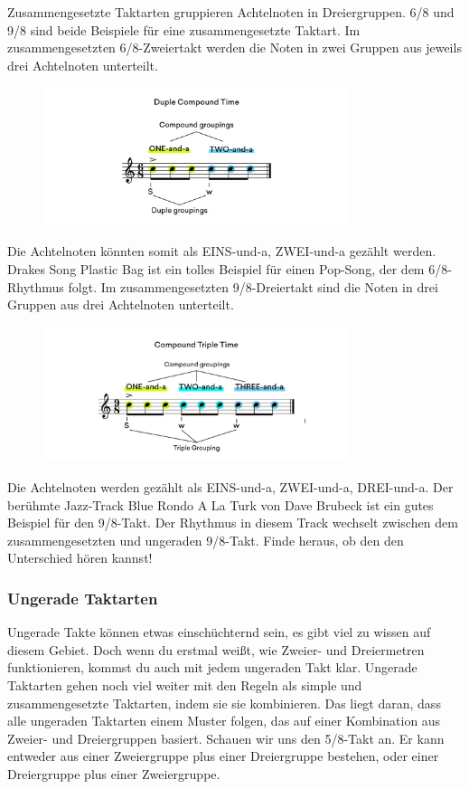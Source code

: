 Zusammengesetzte Taktarten gruppieren Achtelnoten in Dreiergruppen. 6/8 und 9/8 sind beide Beispiele für eine zusammengesetzte Taktart. Im zusammengesetzten 6/8-Zweiertakt werden die Noten in zwei Gruppen aus jeweils drei Achtelnoten unterteilt.

\begin{figure}[H]
    \centering
    \includegraphics[width=0.8\textwidth]{images/Rythm_body_8}
\end{figure}

Die Achtelnoten könnten somit als EINS-und-a, ZWEI-und-a gezählt werden. Drakes Song Plastic Bag ist ein tolles Beispiel für einen Pop-Song, der dem 6/8-Rhythmus folgt. Im zusammengesetzten 9/8-Dreiertakt sind die Noten in drei Gruppen aus drei Achtelnoten unterteilt.

\begin{figure}[H]
    \centering
    \includegraphics[width=0.8\textwidth]{images/Rythm_body_9}
\end{figure}

Die Achtelnoten werden gezählt als EINS-und-a, ZWEI-und-a, DREI-und-a. Der berühmte Jazz-Track Blue Rondo A La Turk von Dave Brubeck ist ein gutes Beispiel für den 9/8-Takt. Der Rhythmus in diesem Track wechselt zwischen dem zusammengesetzten und ungeraden 9/8-Takt. Finde heraus, ob den den Unterschied hören kannst!

\subsubsection{Ungerade Taktarten}
Ungerade Takte können etwas einschüchternd sein, es gibt viel zu wissen auf diesem Gebiet. Doch wenn du erstmal weißt, wie Zweier- und Dreiermetren funktionieren, kommst du auch mit jedem ungeraden Takt klar. Ungerade Taktarten gehen noch viel weiter mit den Regeln als simple und zusammengesetzte Taktarten, indem sie sie kombinieren. Das liegt daran, dass alle ungeraden Taktarten einem Muster folgen, das auf einer Kombination aus Zweier- und Dreiergruppen basiert. Schauen wir uns den 5{/8}-Takt an. Er kann entweder aus einer Zweiergruppe plus einer Dreiergruppe bestehen, oder einer Dreiergruppe plus einer Zweiergruppe.

